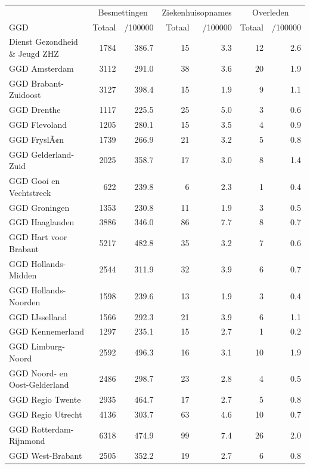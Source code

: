 \documentclass[
  english,
  man,floatsintext]{apa6}
\begin{document}
\begin{table}
\centering\begingroup\fontsize{10}{12}\selectfont

\begin{threeparttable}
\begin{tabular}{lrrrrrr}
\toprule
\multicolumn{1}{c}{ } & \multicolumn{2}{c}{Besmettingen} & \multicolumn{2}{c}{Ziekenhuisopnames} & \multicolumn{2}{c}{Overleden} \\
\cmidrule(l{3pt}r{3pt}){2-3} \cmidrule(l{3pt}r{3pt}){4-5} \cmidrule(l{3pt}r{3pt}){6-7}
GGD & Totaal & /100000 & Totaal & /100000 & Totaal & /100000\\
\midrule
Dienst Gezondheid \& Jeugd ZHZ & 1784 & 386.7 & 15 & 3.3 & 12 & 2.6\\
GGD Amsterdam & 3112 & 291.0 & 38 & 3.6 & 20 & 1.9\\
GGD Brabant-Zuidoost & 3127 & 398.4 & 15 & 1.9 & 9 & 1.1\\
GGD Drenthe & 1117 & 225.5 & 25 & 5.0 & 3 & 0.6\\
GGD Flevoland & 1205 & 280.1 & 15 & 3.5 & 4 & 0.9\\
GGD FryslÃ¢n & 1739 & 266.9 & 21 & 3.2 & 5 & 0.8\\
GGD Gelderland-Zuid & 2025 & 358.7 & 17 & 3.0 & 8 & 1.4\\
GGD Gooi en Vechtstreek & 622 & 239.8 & 6 & 2.3 & 1 & 0.4\\
GGD Groningen & 1353 & 230.8 & 11 & 1.9 & 3 & 0.5\\
GGD Haaglanden & 3886 & 346.0 & 86 & 7.7 & 8 & 0.7\\
GGD Hart voor Brabant & 5217 & 482.8 & 35 & 3.2 & 7 & 0.6\\
GGD Hollands-Midden & 2544 & 311.9 & 32 & 3.9 & 6 & 0.7\\
GGD Hollands-Noorden & 1598 & 239.6 & 13 & 1.9 & 3 & 0.4\\
GGD IJsselland & 1566 & 292.3 & 21 & 3.9 & 6 & 1.1\\
GGD Kennemerland & 1297 & 235.1 & 15 & 2.7 & 1 & 0.2\\
GGD Limburg-Noord & 2592 & 496.3 & 16 & 3.1 & 10 & 1.9\\
GGD Noord- en Oost-Gelderland & 2486 & 298.7 & 23 & 2.8 & 4 & 0.5\\
GGD Regio Twente & 2935 & 464.7 & 17 & 2.7 & 5 & 0.8\\
GGD Regio Utrecht & 4136 & 303.7 & 63 & 4.6 & 10 & 0.7\\
GGD Rotterdam-Rijnmond & 6318 & 474.9 & 99 & 7.4 & 26 & 2.0\\
GGD West-Brabant & 2505 & 352.2 & 19 & 2.7 & 6 & 0.8\\

\end{tabular}
\end{threeparttable}
\end{table}
\end{document}
